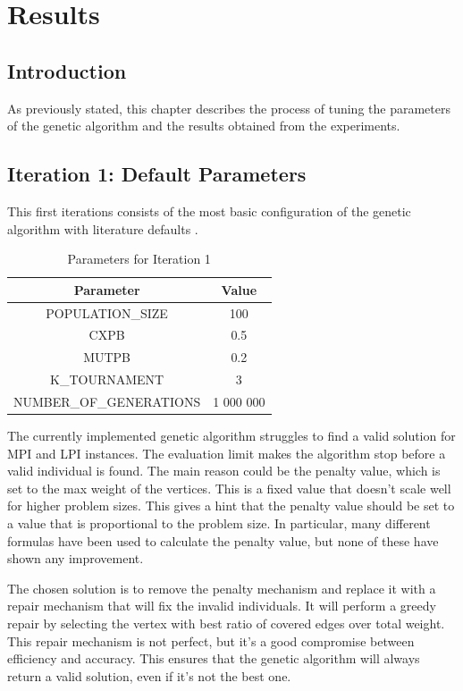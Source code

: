 \chapter{Results}

\section{Introduction}

As previously stated, this chapter describes the process of tuning the parameters of the genetic algorithm and the results obtained from the experiments.

\section{Iteration 1: Default Parameters}

This first iterations consists of the most basic configuration of the genetic algorithm with literature defaults \cite{literature-defaults}.

\begin{table}[h]
    \centering
    \begin{tabular}{|c c|}
        \hline
        \textbf{Parameter} & \textbf{Value} \\
        \hline
        POPULATION\_SIZE & 100 \\
        CXPB & 0.5 \\
        MUTPB & 0.2 \\
        K\_TOURNAMENT & 3 \\
        NUMBER\_OF\_GENERATIONS & 1 000 000 \\
        \hline
    \end{tabular}
    \caption{Parameters for Iteration 1}
    \label{tab:iteration1_parameters}
\end{table}

The currently implemented genetic algorithm struggles to find a valid solution for MPI and LPI instances. The evaluation limit makes the algorithm stop before a valid individual is found. The main reason could be the penalty value, which is set to the max weight of the vertices. This is a fixed value that doesn't scale well for higher problem sizes. This gives a hint that the penalty value should be set to a value that is proportional to the problem size. In particular, many different formulas have been used to calculate the penalty value, but none of these have shown any improvement.

The chosen solution is to remove the penalty mechanism and replace it with a repair mechanism that will fix the invalid individuals. It will perform a greedy repair by selecting the vertex with best ratio of covered edges over total weight. This repair mechanism is not perfect, but it's a good compromise between efficiency and accuracy.
This ensures that the genetic algorithm will always return a valid solution, even if it's not the best one.

